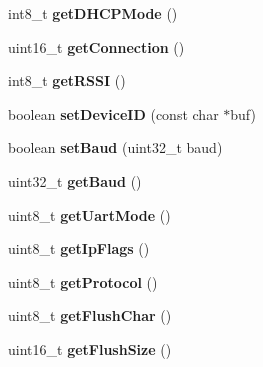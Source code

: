 \begin{DoxyCompactItemize}
\item 
\hypertarget{class_wi_fly_aa64ad4e5585d35cd1cae71c53b02061a}{
int8\-\_\-t {\bfseries get\-D\-H\-C\-P\-Mode} ()}
\label{class_wi_fly_aa64ad4e5585d35cd1cae71c53b02061a}

\item 
\hypertarget{class_wi_fly_a4116b5594a6f7d56472ff705b30f4a0f}{
uint16\-\_\-t {\bfseries get\-Connection} ()}
\label{class_wi_fly_a4116b5594a6f7d56472ff705b30f4a0f}

\item 
\hypertarget{class_wi_fly_a2e55b330d5624f417cd0ec6f8b3c3b52}{
int8\-\_\-t {\bfseries get\-R\-S\-S\-I} ()}
\label{class_wi_fly_a2e55b330d5624f417cd0ec6f8b3c3b52}

\item 
\hypertarget{class_wi_fly_a95baf95ff13c86ede901c532e9cf8cf8}{
boolean {\bfseries set\-Device\-I\-D} (const char $\ast$buf)}
\label{class_wi_fly_a95baf95ff13c86ede901c532e9cf8cf8}

\item 
\hypertarget{class_wi_fly_af6ea7d05f3b9da59dd830e30d5ca1ca5}{
boolean {\bfseries set\-Baud} (uint32\-\_\-t baud)}
\label{class_wi_fly_af6ea7d05f3b9da59dd830e30d5ca1ca5}

\item 
\hypertarget{class_wi_fly_aedbb109f1ab1dd555df4c11e6e0db521}{
uint32\-\_\-t {\bfseries get\-Baud} ()}
\label{class_wi_fly_aedbb109f1ab1dd555df4c11e6e0db521}

\item 
\hypertarget{class_wi_fly_aab41e9c89f08b59dd0bf1f19f59ae6e3}{
uint8\-\_\-t {\bfseries get\-Uart\-Mode} ()}
\label{class_wi_fly_aab41e9c89f08b59dd0bf1f19f59ae6e3}

\item 
\hypertarget{class_wi_fly_a5fa60d2ed785f332a45e80d36adda11f}{
uint8\-\_\-t {\bfseries get\-Ip\-Flags} ()}
\label{class_wi_fly_a5fa60d2ed785f332a45e80d36adda11f}

\item 
\hypertarget{class_wi_fly_a3bc191419c207c3ac4cabf099cfe89b7}{
uint8\-\_\-t {\bfseries get\-Protocol} ()}
\label{class_wi_fly_a3bc191419c207c3ac4cabf099cfe89b7}

\item 
\hypertarget{class_wi_fly_a541747ad0f7918649deba5ebe7bb8ab8}{
uint8\-\_\-t {\bfseries get\-Flush\-Char} ()}
\label{class_wi_fly_a541747ad0f7918649deba5ebe7bb8ab8}

\item 
\hypertarget{class_wi_fly_abeafe4abc068146798f301af4aa50587}{
uint16\-\_\-t {\bfseries get\-Flush\-Size} ()}
\label{class_wi_fly_abeafe4abc068146798f301af4aa50587}


\end{DoxyCompactItemize}
